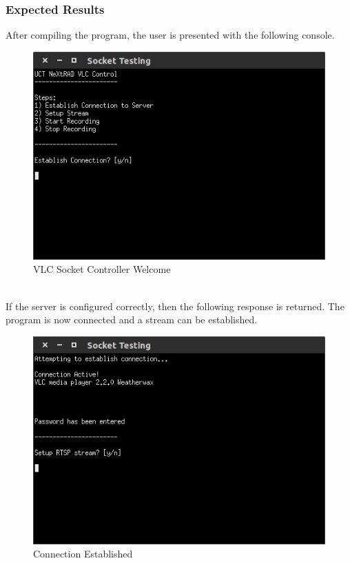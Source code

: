\documentclass[a4paper,11pt]{report}
\begin{document}
\subsubsection{Expected Results}
After compiling the program, the user is presented with the following console.
\begin{figure}[h]
   \begin{center}
     \includegraphics[scale=0.5]{Console_1}
     \caption{VLC Socket Controller Welcome}
   \end{center}
 \end{figure} \\
If the server is configured correctly, then the following response is returned. The program is now connected and a stream can be established.
 \begin{figure}[h]
   \begin{center}
     \includegraphics[scale=0.5]{Console_2}
     \caption{Connection Established}
   \end{center}
 \end{figure} \\
\end{document}
